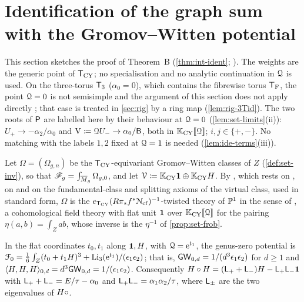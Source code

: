 \section{Identification of the graph sum with the Gromov--Witten potential}
\label{sec:ide}

This section sketches the proof of Theorem~B (\cref{thm:int-ident}; ). The weights are the generic point of $\mathsf{T}_{\mathrm{CY}}$; no specialisation and no analytic continuation in $\mathcal{Q}$ is used. On the three-torus $\mathsf{T}_{3}$ ($\alpha_0=0$), which contains the fibrewise torus $\mathsf{T}_{\mathrm{F}}$, the point $\mathcal{Q}=0$ is not semisimple and the argument of this section does not apply directly ; that case is treated in \cref{sec:rig} by a ring map (\cref{lem:rig-3Tid}). The two roots of $\mathsf{P}$ are labelled here by their behaviour at $\mathcal{Q}=0$ (\cref{lem:set-limits}(ii)): $U_+\to-\alpha_2/\alpha_0$ and $\mathrm{V}\coloneqq\mathcal{Q} U_-\to\alpha_0/\mathsf{B}$, both in $\mathbb{K}_{\mathrm{CY}}[\![ \mathcal{Q} ]\!]$; $i,j\in\{+,-\}$. No matching with the labels $1,2$ fixed at $\mathcal{Q}=1$ is needed (\cref{lem:ide-terms}(iii)).

Let $\Omega=(\Omega_{g,n})$ be the $\mathsf{T}_{\mathrm{CY}}$-equivariant Gromov--Witten classes of $Z$ (\cref{def:set-inv}), so that $\mathscr{F}_g=\int_{\overline{M}_g}\Omega_{g,0}$, and let $\mathcal{V}\coloneqq\mathbb{K}_{\mathrm{CY}}\mathbf{1}\oplus\mathbb{K}_{\mathrm{CY}} H$. By , which rests on \cite{GP99}, on \cite[App.~1~(iv)--(vi)]{CG07} and on the fundamental-class and splitting axioms of the virtual class, used in standard form, $\Omega$ is the $e_{\mathsf{T}_{\mathrm{CY}}}(R\pi_*f^*\mathcal{N}_{\mathrm{cf}})^{-1}$-twisted theory of $\mathbb{P}^1$ in the sense of \cite[Section~1]{CG07}, a cohomological field theory with flat unit $\mathbf{1}$ over $\mathbb{K}_{\mathrm{CY}}[\![ \mathcal{Q} ]\!]$ for the pairing $\eta(a,b)=\int_Zab$, whose inverse is the $\eta^{-1}$ of \cref{prop:set-frob}.

\begin{lem}
\label{lem:ide-g0}
In the flat coordinates $t_0,t_1$ along $\mathbf{1},H$, with $\mathcal{Q}=\mathrm{e}^{t_1}$, the genus-zero potential is $\mathcal{F}_0=\frac16\int_Z(t_0+t_1H)^3+\operatorname{Li}_3(\mathrm{e}^{t_1})/(\epsilon_1\epsilon_2)$; that is, $\mathsf{GW}_{0,d}=1/(d^3\epsilon_1\epsilon_2)$ for $d\geq1$ and $\langle H,H,H\rangle_{0,d}=d^3\mathsf{GW}_{0,d}=1/(\epsilon_1\epsilon_2)$. Consequently $H\circ H=(\mathsf{L}_++\mathsf{L}_-)H-\mathsf{L}_+\mathsf{L}_-\mathbf{1}$ with $\mathsf{L}_++\mathsf{L}_-=E/\tau-\alpha_0$ and $\mathsf{L}_+\mathsf{L}_-=\alpha_1\alpha_2/\tau$, where $\mathsf{L}_\pm$ are the two eigenvalues of $H\circ$.
\end{lem}

